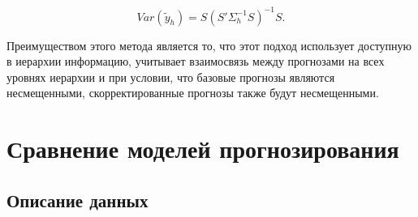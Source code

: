 \documentclass[12pt,a4paper, oneside]{extreport}
\begin{document}
\begin{equation}\label{key}
Var(\tilde{y}_h) =  S (S'\Sigma_h^{-1} S)^{−1}S.
\end{equation}



%
%
%
%
%
%
%
%
%
%	
%	
%	
%	
%	
%	
%	
%	
%	
%	
%	
%

Преимуществом этого метода является то, что этот подход использует  доступную в иерархии информацию, учитывает взаимосвязь   между  прогнозами  на всех  уровнях иерархии и  при условии, что базовые прогнозы являются несмещенными, скорректированные прогнозы также будут несмещенными. 



\chapter{Сравнение моделей прогнозирования}





\section{Описание данных}
\end{document}
